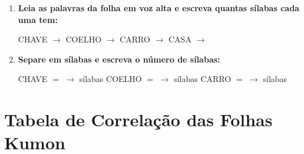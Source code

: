 \begin{exercicio}
\begin{enumerate}[resume]
  \item \textbf{Leia as palavras da folha em voz alta e escreva quantas sílabas cada uma tem:}

  \begin{center}
  CHAVE $\rightarrow$ \underline{\hspace{1cm}} \quad COELHO $\rightarrow$ \underline{\hspace{1cm}} \quad CARRO $\rightarrow$ \underline{\hspace{1cm}} \quad CASA $\rightarrow$ \underline{\hspace{1cm}}
  \end{center}

  \item \textbf{Separe em sílabas e escreva o número de sílabas:}
  \begin{center}
  CHAVE $=$ \underline{\hspace{1.2cm}} $\rightarrow$ \underline{\hspace{0.8cm}} sílabas \quad COELHO $=$ \underline{\hspace{1.2cm}} $\rightarrow$ \underline{\hspace{0.8cm}} sílabas \quad CARRO $=$ \underline{\hspace{1.2cm}} $\rightarrow$ \underline{\hspace{0.8cm}} sílabas
  \end{center}

\end{enumerate}

\end{exercicio}

\chapter{Tabela de Correlação das Folhas Kumon}

